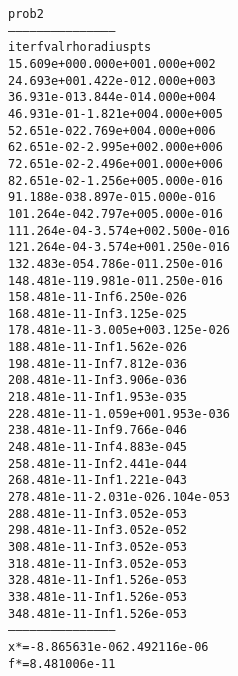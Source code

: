 \begin{alltt}
prob2
---------------------------------------------
iter        fval         rho      radius  pts
   1   5.609e+00   0.000e+00   1.000e+00    2
   2   4.693e+00   1.422e-01   2.000e+00    3
   3   6.931e-01   3.844e-01   4.000e+00    4
   4   6.931e-01  -1.821e+00   4.000e+00    5
   5   2.651e-02   2.769e+00   4.000e+00    6
   6   2.651e-02  -2.995e+00   2.000e+00    6
   7   2.651e-02  -2.496e+00   1.000e+00    6
   8   2.651e-02  -1.256e+00   5.000e-01    6
   9   1.188e-03   8.897e-01   5.000e-01    6
  10   1.264e-04   2.797e+00   5.000e-01    6
  11   1.264e-04  -3.574e+00   2.500e-01    6
  12   1.264e-04  -3.574e+00   1.250e-01    6
  13   2.483e-05   4.786e-01   1.250e-01    6
  14   8.481e-11   9.981e-01   1.250e-01    6
  15   8.481e-11        -Inf   6.250e-02    6
  16   8.481e-11        -Inf   3.125e-02    5
  17   8.481e-11  -3.005e+00   3.125e-02    6
  18   8.481e-11        -Inf   1.562e-02    6
  19   8.481e-11        -Inf   7.812e-03    6
  20   8.481e-11        -Inf   3.906e-03    6
  21   8.481e-11        -Inf   1.953e-03    5
  22   8.481e-11  -1.059e+00   1.953e-03    6
  23   8.481e-11        -Inf   9.766e-04    6
  24   8.481e-11        -Inf   4.883e-04    5
  25   8.481e-11        -Inf   2.441e-04    4
  26   8.481e-11        -Inf   1.221e-04    3
  27   8.481e-11  -2.031e-02   6.104e-05    3
  28   8.481e-11        -Inf   3.052e-05    3
  29   8.481e-11        -Inf   3.052e-05    2
  30   8.481e-11        -Inf   3.052e-05    3
  31   8.481e-11        -Inf   3.052e-05    3
  32   8.481e-11        -Inf   1.526e-05    3
  33   8.481e-11        -Inf   1.526e-05    3
  34   8.481e-11        -Inf   1.526e-05    3
---------------------------------------------
x* = -8.865631e-06  2.492116e-06  
f* = 8.481006e-11
\end{alltt}

